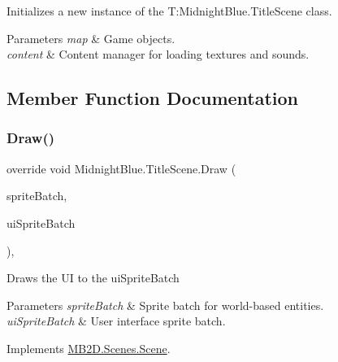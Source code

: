 Initializes a new instance of the T\+:\+Midnight\+Blue.\+Title\+Scene class. 


\begin{DoxyParams}{Parameters}
{\em map} & Game objects.\\
\hline
{\em content} & Content manager for loading textures and sounds.\\
\hline
\end{DoxyParams}


\subsection{Member Function Documentation}
\hypertarget{class_midnight_blue_1_1_title_scene_a03fa806a36226ec5fd0ce09870109c18}{}\label{class_midnight_blue_1_1_title_scene_a03fa806a36226ec5fd0ce09870109c18} 
\subsubsection{\texorpdfstring{Draw()}{Draw()}}
{\footnotesize\ttfamily override void Midnight\+Blue.\+Title\+Scene.\+Draw (\begin{DoxyParamCaption}\item[{Sprite\+Batch}]{sprite\+Batch,  }\item[{Sprite\+Batch}]{ui\+Sprite\+Batch }\end{DoxyParamCaption})\hspace{0.3cm}{\ttfamily [inline]}, {\ttfamily [virtual]}}



Draws the UI to the ui\+Sprite\+Batch 


\begin{DoxyParams}{Parameters}
{\em sprite\+Batch} & Sprite batch for world-\/based entities.\\
\hline
{\em ui\+Sprite\+Batch} & User interface sprite batch.\\
\hline
\end{DoxyParams}


Implements \hyperlink{class_m_b2_d_1_1_scenes_1_1_scene_a932d33071ecb4c5187367825dba72324}{M\+B2\+D.\+Scenes.\+Scene}.

